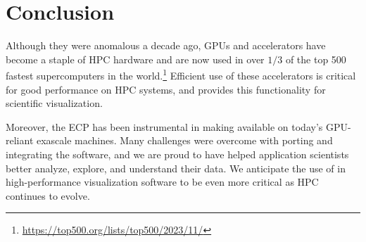\section{Conclusion}


Although they were anomalous a decade ago, GPUs and accelerators have become a staple of HPC hardware and are now used in over $1/3$ of the top 500 fastest supercomputers in the world.\footnote{\url{https://top500.org/lists/top500/2023/11/}}
Efficient use of these accelerators is critical for good performance on HPC systems, and \vtkm provides this functionality for scientific visualization.

Moreover, the ECP has been instrumental in making \vtkm available on today's GPU-reliant exascale machines.
Many challenges were overcome with porting and integrating the software, and we are proud to have helped application scientists better analyze, explore, and understand their data.
We anticipate the use of \vtkm in high-performance visualization software to be even more critical as HPC continues to evolve.
